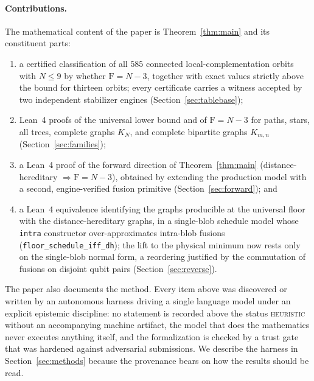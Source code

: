 \documentclass[11pt]{article}
\theoremstyle{definition}
\theoremstyle{remark}
\newcommand{\F}{\mathrm{F}}
\newcommand{\N}{N}
\newcommand{\code}[1]{\texttt{#1}}
\begin{document}
\paragraph{Contributions.} The mathematical content of the paper is Theorem~\ref{thm:main} and its
constituent parts:
\begin{enumerate}[nosep,leftmargin=1.4em]
\item a certified classification of all $585$ connected local-complementation orbits with
      $\N\le 9$ by whether $\F=\N-3$, together with exact values strictly above the bound for
      thirteen orbits; every certificate carries a witness accepted by two independent stabilizer
      engines (Section~\ref{sec:tablebase});
\item Lean~4 proofs of the universal lower bound and of $\F=\N-3$ for paths, stars, all trees,
      complete graphs $K_\N$, and complete bipartite graphs $K_{m,n}$
      (Section~\ref{sec:families});
\item a Lean~4 proof of the forward direction of Theorem~\ref{thm:main}
      (distance-hereditary $\Rightarrow \F=\N-3$), obtained by extending the production model with
      a second, engine-verified fusion primitive (Section~\ref{sec:forward}); and
\item a Lean~4 equivalence identifying the graphs producible at the universal floor with the
      distance-hereditary graphs, in a single-blob schedule model whose \code{intra} constructor
      over-approximates intra-blob fusions (\code{floor\_schedule\_iff\_dh}); the lift to the
      physical minimum now rests only on the single-blob normal form, a reordering justified by
      the commutation of fusions on disjoint qubit pairs (Section~\ref{sec:reverse}).
\end{enumerate}

The paper also documents the method. Every item above was discovered or written by an autonomous
harness driving a single language model under an explicit epistemic discipline: no statement is
recorded above the status \textsc{heuristic} without an accompanying machine artifact, the model
that does the mathematics never executes anything itself, and the formalization is checked by a
trust gate that was hardened against adversarial submissions. We describe the harness in
Section~\ref{sec:methods} because the provenance bears on how the results should be read.
\end{document}
